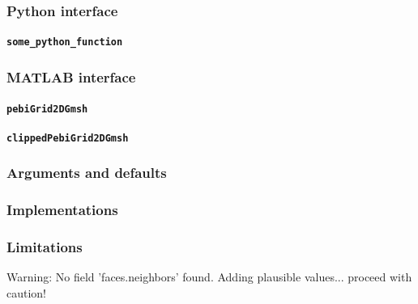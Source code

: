 \subsubsection{Python interface}

\paragraph{\texttt{some\_python\_function}}

\subsubsection{MATLAB interface}

\paragraph{\texttt{pebiGrid2DGmsh}}

\paragraph{\texttt{clippedPebiGrid2DGmsh}}

\subsubsection{Arguments and defaults}

\subsubsection{Implementations}

\subsubsection{Limitations}

\begin{codeError}
Warning: No field 'faces.neighbors' found. Adding plausible values... proceed with caution! 
\end{codeError}
